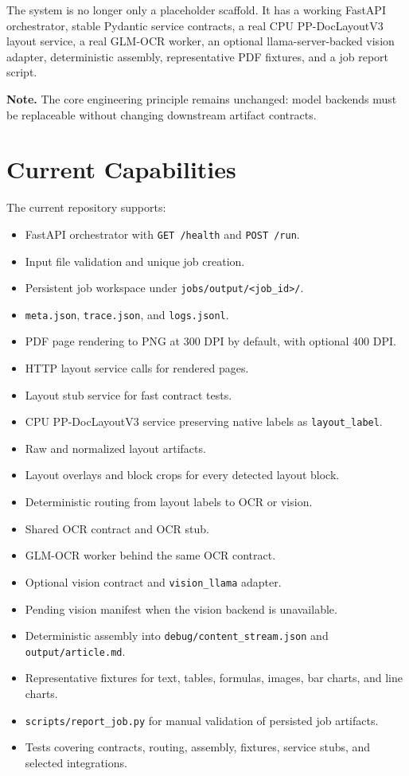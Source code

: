 \documentclass[11pt,a4paper]{article}
\newcommand{\docnote}[1]{
\begin{framed}
\noindent\textbf{Note.} #1
\end{framed}
}
\begin{document}
The system is no longer only a placeholder scaffold. It has a working FastAPI
orchestrator, stable Pydantic service contracts, a real CPU PP-DocLayoutV3
layout service, a real GLM-OCR worker, an optional llama-server-backed vision
adapter, deterministic assembly, representative PDF fixtures, and a job report
script.

\docnote{The core engineering principle remains unchanged: model backends must
be replaceable without changing downstream artifact contracts.}

\section{Current Capabilities}

The current repository supports:

\begin{itemize}[leftmargin=1.2cm]
\item FastAPI orchestrator with \texttt{GET /health} and \texttt{POST /run}.
\item Input file validation and unique job creation.
\item Persistent job workspace under \texttt{jobs/output/<job\_id>/}.
\item \texttt{meta.json}, \texttt{trace.json}, and \texttt{logs.jsonl}.
\item PDF page rendering to PNG at 300 DPI by default, with optional 400 DPI.
\item HTTP layout service calls for rendered pages.
\item Layout stub service for fast contract tests.
\item CPU PP-DocLayoutV3 service preserving native labels as
  \texttt{layout\_label}.
\item Raw and normalized layout artifacts.
\item Layout overlays and block crops for every detected layout block.
\item Deterministic routing from layout labels to OCR or vision.
\item Shared OCR contract and OCR stub.
\item GLM-OCR worker behind the same OCR contract.
\item Optional vision contract and \texttt{vision\_llama} adapter.
\item Pending vision manifest when the vision backend is unavailable.
\item Deterministic assembly into \texttt{debug/content\_stream.json} and
  \texttt{output/article.md}.
\item Representative fixtures for text, tables, formulas, images, bar charts,
  and line charts.
\item \texttt{scripts/report\_job.py} for manual validation of persisted job
  artifacts.
\item Tests covering contracts, routing, assembly, fixtures, service stubs, and
  selected integrations.
\end{itemize}
\end{document}
